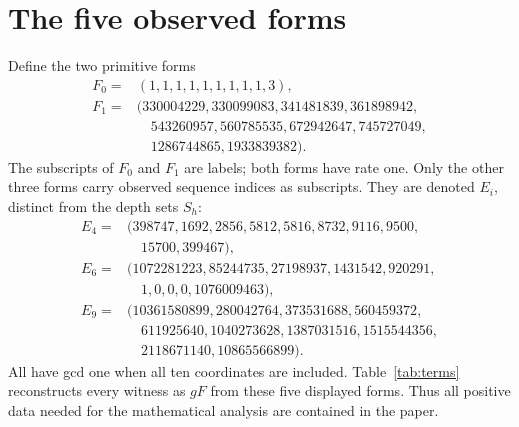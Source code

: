\documentclass[11pt]{article}
\theoremstyle{definition}
\theoremstyle{remark}
\begin{document}
\section{The five observed forms}\label{sec:forms}

Define the two primitive forms
\begin{equation}\label{eq:infiniteforms}
\begin{split}
 F_0={}&(1,1,1,1,1,1,1,1,1,3),\\
 F_1={}&(330004229,330099083,341481839,361898942,\\
       &\quad543260957,560785535,672942647,745727049,\\
       &\quad1286744865,1933839382).
\end{split}
\end{equation}
The subscripts of $F_0$ and $F_1$ are labels; both forms have rate
one. Only the other three forms carry observed sequence indices as
subscripts. They are denoted $E_i$, distinct from the depth sets $S_h$:
\begin{equation}\label{eq:singleforms}
\begin{split}
 E_4={}&(398747,1692,2856,5812,5816,8732,9116,9500,\\
       &\quad15700,399467),\\
 E_6={}&(1072281223,85244735,27198937,1431542,920291,\\
       &\quad1,0,0,0,1076009463),\\
 E_9={}&(10361580899,280042764,373531688,560459372,\\
       &\quad611925640,1040273628,1387031516,1515544356,\\
       &\quad2118671140,10865566899).
\end{split}
\end{equation}
All have gcd one when all ten coordinates are included.
Table~\ref{tab:terms} reconstructs every witness as $gF$ from these
five displayed forms. Thus all positive data needed for the mathematical
analysis are contained in the paper.
\end{document}
